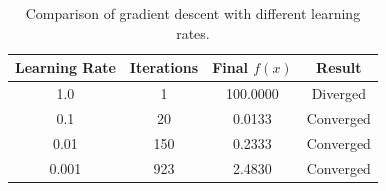 \documentclass{article}
\begin{document}
\begin{table}[h]
\centering
\begin{tabular}{@{}cccc@{}}
\toprule
\textbf{Learning Rate} & \textbf{Iterations} & \textbf{Final $f(x)$} & \textbf{Result} \\ \midrule
1.0   & 1   & 100.0000 & Diverged \\
0.1   & 20  & 0.0133   & Converged \\
0.01  & 150 & 0.2333   & Converged \\
0.001 & 923 & 2.4830   & Converged \\ \bottomrule
\end{tabular}
\caption{Comparison of gradient descent with different learning rates.}
\end{table}
 
\end{document}
